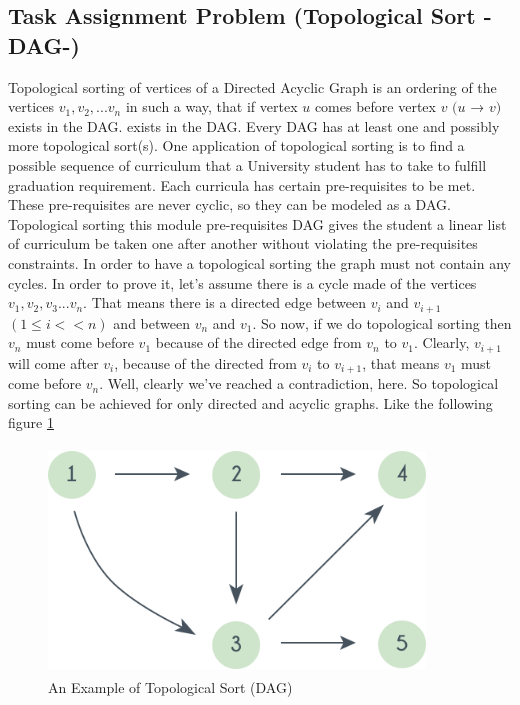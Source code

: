 \newpage

\subsection{Task Assignment Problem (Topological Sort -DAG-)}
Topological sorting of vertices of a Directed Acyclic Graph is an ordering of the vertices $v_1, v_2, ... v_n$ in such a way, that if vertex $u$ comes before vertex $v$ $(u $ → $ v)$ exists in the DAG. 
exists in the DAG. Every DAG has at least one and possibly more topological sort(s). One application of topological sorting is to find a possible sequence of curriculum that a University student has to take to fulfill graduation requirement. Each curricula has certain pre-requisites to be met. These pre-requisites are never cyclic, so they can be modeled as a DAG. Topological sorting this module pre-requisites DAG gives the student a linear list of curriculum be taken one after another without violating the pre-requisites constraints. In order to have a topological sorting the graph must not contain any cycles. In order to prove it, let's assume there is a cycle made of the vertices $v_1, v_2, v_3 ... v_n$. That means there is a directed edge between $v_i$ and $v_{i+1}$ $(1 \le i \lt< n)$ and between $v_n$ and $v_1$. So now, if we do topological sorting then $v_n$ must come before $v_1$ because of the directed edge from $v_n$ to $v_1$. Clearly, $v_{i+1}$ will come after $v_i$, because of the directed from $v_i$ to $v_{i+1}$, that means $v_1$ must come before $v_n$. Well, clearly we've reached a contradiction, here. So topological sorting can be achieved for only directed and acyclic graphs. Like the following figure \ref{fig:topo-sort}
\begin{figure}[h]
    \centering
\includegraphics[width=10cm, height=6cm]{topo-sort.png}
 \caption{An Example of Topological Sort (DAG)}\footnotemark
    \label{fig:topo-sort}
\end{figure}

